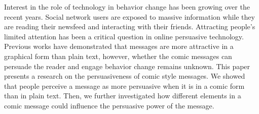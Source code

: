 
Interest in the role of technology in behavior
change has been growing over the recent years.
Social network users are exposed to massive
information while they are reading their
newsfeed and interacting with their friends.
Attracting people's limited attention has been
a critical question in online persuasive technology.
Previous works have demonstrated that messages are
more attractive in a graphical form than plain text,
however, whether the comic messages can persuade the
reader and engage behavior change remains unknown.
This paper presents a research on the persuasiveness of
comic style messages. We showed that people perceive a message as more
persuasive when it is in a comic form than in plain text.
Then, we further investigated how different elements in
a comic message could influence the persuasive power of the message.

